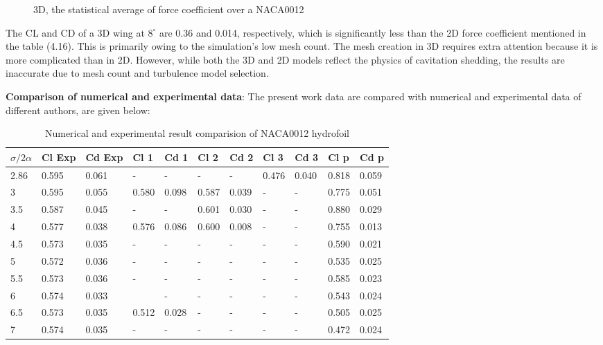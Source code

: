 \begin{figure}[H]
    \centering
    \qquad
  \caption{3D, the statistical average of force coefficient  over a NACA0012}
  \label{fig:fig16}
\end{figure}
The CL and CD of a 3D wing at $8^ {\circ}$ are 0.36 and 0.014, respectively, which is significantly less than the 2D force coefficient mentioned in the table (4.16).
This is primarily owing to the simulation's low mesh count.
The mesh creation in 3D requires extra attention because it is more complicated than in 2D. However, while both the 3D and 2D models reflect the physics of cavitation 
shedding, the results are inaccurate due to mesh count and turbulence model selection. 

\textbf{Comparison of numerical and experimental data}: The present work data are compared with numerical and experimental data of different authors, are given below:
\begin{table}[h]
\centering
\begin{tabular}{|l|l|l|l|l|l|l|l|l|l|l|}
\hline
\rowcolor{gray!20} ${\sigma}/{2\alpha}$& Cl Exp &Cd Exp  & Cl 1 & Cd 1 &Cl 2  &Cd 2 &Cl 3  &Cd 3  & Cl p &Cd p  \\ \hline
2.86 &0.595  & 0.061 &- &-  &-  & - &0.476  & 0.040 & 0.818 &0.059  \\ \hline
 3&0.595  &0.055  &0.580  &0.098 &0.587  &0.039  &-  &-  &0.775  &0.051  \\ \hline
 3.5&0.587  &0.045  &-  & - &0.601  &0.030  &-  & - & 0.880 &0.029 \\ \hline
4 & 0.577 &0.038  &0.576  &0.086  &0.600  &0.008  &-  & - &0.755 &0.013  \\ \hline
4.5 &0.573  &0.035  &-  &-  & - &- & - & - & 0.590 &0.021  \\ \hline
 5&0.572  &0.036  &-  &-  & - & - & - &-  &0.535  & 0.025 \\ \hline
 5.5& 0.573 & 0.036 &-  & - & - & - & - & -  &0.585  &0.023  \\ \hline
6 &0.574  & 0.033 &  &-  &-  & - & - & - & 0.543 &0.024  \\ \hline
6.5 & 0.573 & 0.035 &0.512  &0.028  & - &- & - & - & 0.505 & 0.025 \\ \hline
 7 & 0.574 & 0.035 &- & - & - & - & - &-  & 0.472 & 0.024 \\ \hline
\end{tabular}
\caption{Numerical and experimental result comparision of NACA0012 hydrofoil}
\label{fig:fig16}
\end{table}


